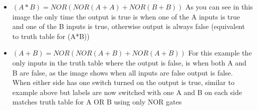 \documentclass{article}
\begin{document}
\begin{itemize}
    \item $(A*B) = NOR(NOR(A+A) + NOR(B+B))$\newline
    \newline
    As you can see in this image the only time the output is true is when one of the A inputs is true and one of the B inputs is true, otherwise output is always false (equivalent to truth table for (A*B)) \newline
    
    \item $(A+B) = NOR(NOR(A+B) + NOR(A+B))$ \newline
    \newline
    For this example the only inputs in the truth table where the output is false, is when both A and B are false, as the image shows when all inputs are false output is false. When either side has one switch turned on the output is true, similar to example above but labels are now switched with one A and B on each side {matches truth table for A OR B using only NOR gates}\newline
    

\end{itemize}
\end{document}
